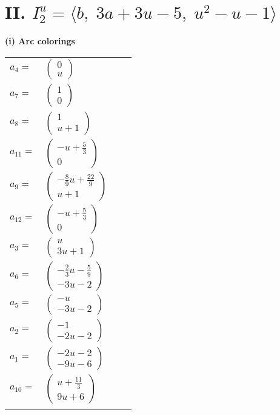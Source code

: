 \documentclass[1p]{elsarticle_modified}
\theoremstyle{definition}
\begin{document}
\centering \section*{II. $I^u_{2}= \langle b,\;3 a+3 u-5,\;u^2- u-1 \rangle$}
\flushleft \textbf{(i) Arc colorings}\\
\begin{tabular}{m{7pt} m{180pt} m{7pt} m{180pt} }
\flushright $a_{4}=$&$\begin{pmatrix}0\\u\end{pmatrix}$ \\
\flushright $a_{7}=$&$\begin{pmatrix}1\\0\end{pmatrix}$ \\
\flushright $a_{8}=$&$\begin{pmatrix}1\\u+1\end{pmatrix}$ \\
\flushright $a_{11}=$&$\begin{pmatrix}- u+\frac{5}{3}\\0\end{pmatrix}$ \\
\flushright $a_{9}=$&$\begin{pmatrix}-\frac{8}{9} u+\frac{22}{9}\\u+1\end{pmatrix}$ \\
\flushright $a_{12}=$&$\begin{pmatrix}- u+\frac{5}{3}\\0\end{pmatrix}$ \\
\flushright $a_{3}=$&$\begin{pmatrix}u\\3 u+1\end{pmatrix}$ \\
\flushright $a_{6}=$&$\begin{pmatrix}-\frac{2}{3} u-\frac{5}{9}\\-3 u-2\end{pmatrix}$ \\
\flushright $a_{5}=$&$\begin{pmatrix}- u\\-3 u-2\end{pmatrix}$ \\
\flushright $a_{2}=$&$\begin{pmatrix}-1\\-2 u-2\end{pmatrix}$ \\
\flushright $a_{1}=$&$\begin{pmatrix}-2 u-2\\-9 u-6\end{pmatrix}$ \\
\flushright $a_{10}=$&$\begin{pmatrix}u+\frac{11}{3}\\9 u+6\end{pmatrix}$\\&\end{tabular}
\end{document}
